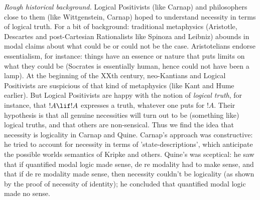 \documentclass[../../../include/open-logic-section]{subfiles}
\begin{document}
\emph{Rough historical background.} Logical Positivists (like Carnap) and 
philosophers close to them (like Wittgenstein, Carnap) hoped to 
understand necessity in terms of logical truth. For a bit of background:
traditional metaphysics (Aristotle, Descartes
and post-Cartesian Rationalists like Spinoza and Leibniz) abounds in
modal claims about what could be or could not be the case. Aristotelians
endorse essentialism, for instance: things have an essence or nature 
that puts limits on what they could be (Socrates is essentially human,
hence could not have been a lamp). At the
beginning of the XXth century, neo-Kantians and Logical Positivists
are suspicious of that kind of metaphysics (like Kant and Hume
earlier). But Logical Positivists are happy with the notion of 
\emph{logical truth}, for instance, that $!A\lif!A$ expresses a 
truth, whatever one puts for $!A$. Their hypothesis is that all 
genuine necessities will turn out to be (something like) 
logical truths, and that others are non-sensical. Thus we find the idea
that necessity is logicality in Carnap and Quine. Carnap's approach was
constructive: he tried to account for necessity in terms of 
'state-descriptions', which anticipate the possible worlds semantics
of Kripke and others. Quine's was sceptical: he saw that if quantified
modal logic made sense, de re modality had to make sense, and that if
de re modality made sense, then necessity couldn't be logicality (as
shown by the proof of necessity of identity); he concluded that 
quantified modal logic made no sense.
\end{document}
